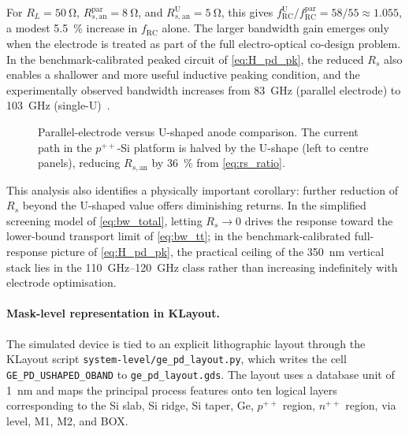 For $R_L=\SI{50}{\ohm}$, $R_{s,\mathrm{an}}^{\mathrm{par}}=\SI{8}{\ohm}$, and
$R_{s,\mathrm{an}}^{\mathrm{U}}=\SI{5}{\ohm}$, this gives
$f_{\mathrm{RC}}^{\mathrm{U}}/f_{\mathrm{RC}}^{\mathrm{par}}=58/55\approx1.055$,
a modest \SI{5.5}{\percent} increase in $f_{\mathrm{RC}}$ alone. The larger
bandwidth gain emerges only when the electrode is treated as part of the full
electro-optical co-design problem. In the benchmark-calibrated peaked circuit of
\cref{eq:H_pd_pk}, the reduced $R_s$ also enables a shallower and more useful
inductive peaking condition, and the experimentally observed bandwidth increases
from \SI{83}{\giga\hertz} (parallel electrode) to
\SI{103}{\giga\hertz} (single-U)~\cite{Shi2024}.

\begin{figure}[H]
\centering
{}
\caption{Parallel-electrode versus U-shaped anode comparison. The current path
in the $p^{++}$-Si platform is halved by the U-shape (left to centre panels),
reducing $R_{s,\mathrm{an}}$ by \SI{36}{\percent} from \cref{eq:rs_ratio}.}
\label{fig:electrode_compare}
\end{figure}

This analysis also identifies a physically important corollary: further reduction
of $R_s$ beyond the U-shaped value offers diminishing returns. In the
simplified screening model of \cref{eq:bw_total}, letting $R_s\to0$ drives the
response toward the lower-bound transport limit of \cref{eq:bw_tt}; in the
benchmark-calibrated full-response picture of \cref{eq:H_pd_pk}, the practical
ceiling of the \SI{350}{\nano\metre} vertical stack lies in the
\SIrange{110}{120}{\giga\hertz} class rather than increasing indefinitely with
electrode optimisation.

\paragraph{Mask-level representation in KLayout.}
The simulated device is tied to an explicit lithographic layout through the
KLayout script \texttt{system-level/ge\_pd\_layout.py}, which writes the cell
\texttt{GE\_PD\_USHAPED\_OBAND} to \texttt{ge\_pd\_layout.gds}. The layout uses
a database unit of \SI{1}{\nano\metre} and maps the principal process features
onto ten logical layers corresponding to the Si slab, Si ridge, Si taper, Ge,
$p^{++}$ region, $n^{++}$ region, via level, M1, M2, and BOX.


